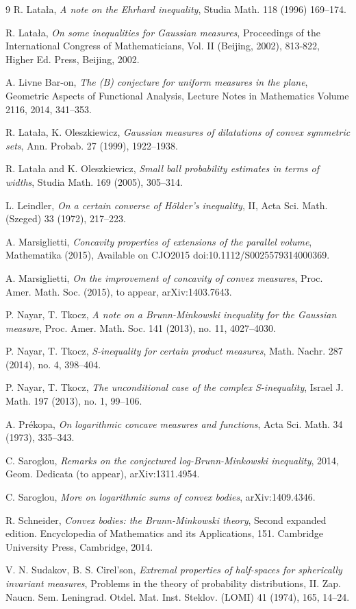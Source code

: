 \documentclass[11pt]{article}
\newcommand{\1}{\mathbf{{1}}}
\theoremstyle{definition}
\begin{document}
\begin{thebibliography}{9}
 R. Latała, \emph{A note on the Ehrhard inequality}, Studia Math. 118 (1996) 169–174.

 R. Lata\l a, \emph{On some inequalities for Gaussian measures}, Proceedings of the International Congress of Mathematicians, Vol. II (Beijing, 2002), 813-822, Higher Ed. Press, Beijing, 2002.

  A. Livne  Bar-on,
\emph{The (B) conjecture   for   uniform   measures   in   the   plane},
Geometric Aspects of Functional Analysis,
Lecture Notes in Mathematics Volume 2116, 2014, 341--353.

 R. Lata\l a, K. Oleszkiewicz, \emph{Gaussian measures of dilatations of convex symmetric sets}, Ann. Probab. 27 (1999), 1922--1938.

 R. Lata\l a and K. Oleszkiewicz, \emph{Small ball probability estimates in terms of widths}, Studia Math. 169 (2005), 305--314.

 L. Leindler, \emph{On a certain converse of H\"older’s inequality}, II, Acta Sci. Math. (Szeged) 33
(1972), 217–223.

 A. Marsiglietti, \emph{Concavity properties of extensions of the parallel
volume}, Mathematika (2015), Available on CJO2015 doi:10.1112/S0025579314000369.

 A. Marsiglietti, \emph{On the improvement of concavity of convex measures}, Proc. Amer. Math. Soc. (2015), to appear, arXiv:1403.7643.

 P. Nayar, T. Tkocz, \emph{A note on a Brunn-Minkowski inequality for the Gaussian measure},
Proc. Amer. Math. Soc. 141 (2013), no. 11, 4027–4030.

 P. Nayar, T. Tkocz, \emph{S-inequality for certain product measures}, Math. Nachr. 287 (2014), no. 4, 398–404.

 P. Nayar, T. Tkocz,
\emph{The unconditional case of the complex S-inequality},
Israel J. Math. 197 (2013), no. 1, 99–106.

 A. Pr\'ekopa, \emph{On logarithmic concave measures and functions}, Acta Sci. Math. 34 (1973), 335–343.

 C. Saroglou, \emph{Remarks on the conjectured log-Brunn-Minkowski inequality}, 2014, Geom. Dedicata (to appear), arXiv:1311.4954.

 C. Saroglou, \emph{More on logarithmic sums of convex bodies}, arXiv:1409.4346.

 R. Schneider, \emph{Convex bodies: the Brunn-Minkowski theory}, Second expanded edition. Encyclopedia of Mathematics and its Applications, 151. Cambridge University Press, Cambridge, 2014.

 V. N. Sudakov, B. S. Cirel'son,  \emph{Extremal properties of half-spaces for spherically invariant
measures}, Problems in the theory of probability distributions, II.
Zap. Naucn. Sem. Leningrad. Otdel. Mat. Inst. Steklov. (LOMI) 41 (1974), 165, 14–24.

\end{thebibliography}
\end{document}

